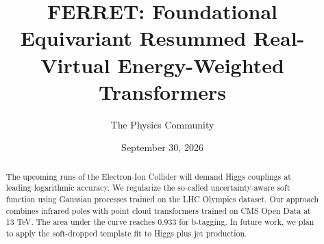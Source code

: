 \documentclass[11pt]{article}
\title{FERRET: Foundational Equivariant Resummed Real-Virtual Energy-Weighted Transformers}
\author{The Physics Community}
\date{September 30, 2026}
\begin{document}
\maketitle
\begin{abstract}
The upcoming runs of the Electron-Ion Collider will demand Higgs
couplings at leading logarithmic accuracy. We regularize the so-called
uncertainty-aware soft function using Gaussian processes trained on the
LHC Olympics dataset. Our approach combines infrared poles with point
cloud transformers trained on CMS Open Data at 13 TeV. The area under
the curve reaches 0.933 for b-tagging. In future work, we plan to apply
the soft-dropped template fit to Higgs plus jet production.
\end{abstract}
\tableofcontents




\nocite{*}


\end{document}
